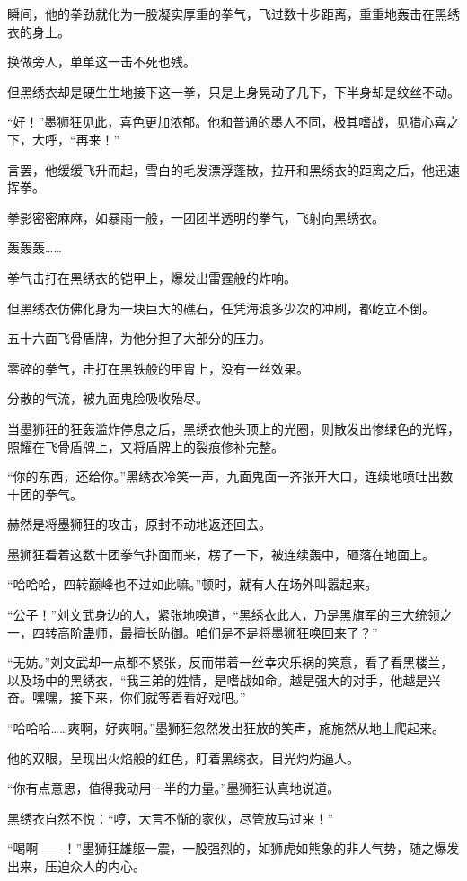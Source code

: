 \begin{this_body}
瞬间，他的拳劲就化为一股凝实厚重的拳气，飞过数十步距离，重重地轰击在黑绣衣的身上。

换做旁人，单单这一击不死也残。

但黑绣衣却是硬生生地接下这一拳，只是上身晃动了几下，下半身却是纹丝不动。

“好！”墨狮狂见此，喜色更加浓郁。他和普通的墨人不同，极其嗜战，见猎心喜之下，大呼，“再来！”

言罢，他缓缓飞升而起，雪白的毛发漂浮蓬散，拉开和黑绣衣的距离之后，他迅速挥拳。

拳影密密麻麻，如暴雨一般，一团团半透明的拳气，飞射向黑绣衣。

轰轰轰……

拳气击打在黑绣衣的铠甲上，爆发出雷霆般的炸响。

但黑绣衣仿佛化身为一块巨大的礁石，任凭海浪多少次的冲刷，都屹立不倒。

五十六面飞骨盾牌，为他分担了大部分的压力。

零碎的拳气，击打在黑铁般的甲胄上，没有一丝效果。

分散的气流，被九面鬼脸吸收殆尽。

当墨狮狂的狂轰滥炸停息之后，黑绣衣他头顶上的光圈，则散发出惨绿色的光辉，照耀在飞骨盾牌上，又将盾牌上的裂痕修补完整。

“你的东西，还给你。”黑绣衣冷笑一声，九面鬼面一齐张开大口，连续地喷吐出数十团的拳气。

赫然是将墨狮狂的攻击，原封不动地返还回去。

墨狮狂看着这数十团拳气扑面而来，楞了一下，被连续轰中，砸落在地面上。

“哈哈哈，四转巅峰也不过如此嘛。”顿时，就有人在场外叫嚣起来。

“公子！”刘文武身边的人，紧张地唤道，“黑绣衣此人，乃是黑旗军的三大统领之一，四转高阶蛊师，最擅长防御。咱们是不是将墨狮狂唤回来了？”

“无妨。”刘文武却一点都不紧张，反而带着一丝幸灾乐祸的笑意，看了看黑楼兰，以及场中的黑绣衣，“我三弟的姓情，是嗜战如命。越是强大的对手，他越是兴奋。嘿嘿，接下来，你们就等着看好戏吧。”

“哈哈哈……爽啊，好爽啊。”墨狮狂忽然发出狂放的笑声，施施然从地上爬起来。

他的双眼，呈现出火焰般的红色，盯着黑绣衣，目光灼灼逼人。

“你有点意思，值得我动用一半的力量。”墨狮狂认真地说道。

黑绣衣自然不悦：“哼，大言不惭的家伙，尽管放马过来！”

“喝啊――！”墨狮狂雄躯一震，一股强烈的，如狮虎如熊象的非人气势，随之爆发出来，压迫众人的内心。


\end{this_body}
